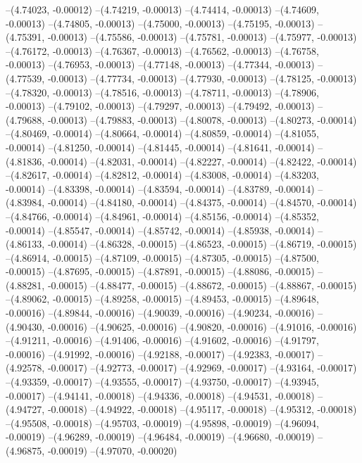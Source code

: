 --(4.74023, -0.00012)
--(4.74219, -0.00013)
--(4.74414, -0.00013)
--(4.74609, -0.00013)
--(4.74805, -0.00013)
--(4.75000, -0.00013)
--(4.75195, -0.00013)
--(4.75391, -0.00013)
--(4.75586, -0.00013)
--(4.75781, -0.00013)
--(4.75977, -0.00013)
--(4.76172, -0.00013)
--(4.76367, -0.00013)
--(4.76562, -0.00013)
--(4.76758, -0.00013)
--(4.76953, -0.00013)
--(4.77148, -0.00013)
--(4.77344, -0.00013)
--(4.77539, -0.00013)
--(4.77734, -0.00013)
--(4.77930, -0.00013)
--(4.78125, -0.00013)
--(4.78320, -0.00013)
--(4.78516, -0.00013)
--(4.78711, -0.00013)
--(4.78906, -0.00013)
--(4.79102, -0.00013)
--(4.79297, -0.00013)
--(4.79492, -0.00013)
--(4.79688, -0.00013)
--(4.79883, -0.00013)
--(4.80078, -0.00013)
--(4.80273, -0.00014)
--(4.80469, -0.00014)
--(4.80664, -0.00014)
--(4.80859, -0.00014)
--(4.81055, -0.00014)
--(4.81250, -0.00014)
--(4.81445, -0.00014)
--(4.81641, -0.00014)
--(4.81836, -0.00014)
--(4.82031, -0.00014)
--(4.82227, -0.00014)
--(4.82422, -0.00014)
--(4.82617, -0.00014)
--(4.82812, -0.00014)
--(4.83008, -0.00014)
--(4.83203, -0.00014)
--(4.83398, -0.00014)
--(4.83594, -0.00014)
--(4.83789, -0.00014)
--(4.83984, -0.00014)
--(4.84180, -0.00014)
--(4.84375, -0.00014)
--(4.84570, -0.00014)
--(4.84766, -0.00014)
--(4.84961, -0.00014)
--(4.85156, -0.00014)
--(4.85352, -0.00014)
--(4.85547, -0.00014)
--(4.85742, -0.00014)
--(4.85938, -0.00014)
--(4.86133, -0.00014)
--(4.86328, -0.00015)
--(4.86523, -0.00015)
--(4.86719, -0.00015)
--(4.86914, -0.00015)
--(4.87109, -0.00015)
--(4.87305, -0.00015)
--(4.87500, -0.00015)
--(4.87695, -0.00015)
--(4.87891, -0.00015)
--(4.88086, -0.00015)
--(4.88281, -0.00015)
--(4.88477, -0.00015)
--(4.88672, -0.00015)
--(4.88867, -0.00015)
--(4.89062, -0.00015)
--(4.89258, -0.00015)
--(4.89453, -0.00015)
--(4.89648, -0.00016)
--(4.89844, -0.00016)
--(4.90039, -0.00016)
--(4.90234, -0.00016)
--(4.90430, -0.00016)
--(4.90625, -0.00016)
--(4.90820, -0.00016)
--(4.91016, -0.00016)
--(4.91211, -0.00016)
--(4.91406, -0.00016)
--(4.91602, -0.00016)
--(4.91797, -0.00016)
--(4.91992, -0.00016)
--(4.92188, -0.00017)
--(4.92383, -0.00017)
--(4.92578, -0.00017)
--(4.92773, -0.00017)
--(4.92969, -0.00017)
--(4.93164, -0.00017)
--(4.93359, -0.00017)
--(4.93555, -0.00017)
--(4.93750, -0.00017)
--(4.93945, -0.00017)
--(4.94141, -0.00018)
--(4.94336, -0.00018)
--(4.94531, -0.00018)
--(4.94727, -0.00018)
--(4.94922, -0.00018)
--(4.95117, -0.00018)
--(4.95312, -0.00018)
--(4.95508, -0.00018)
--(4.95703, -0.00019)
--(4.95898, -0.00019)
--(4.96094, -0.00019)
--(4.96289, -0.00019)
--(4.96484, -0.00019)
--(4.96680, -0.00019)
--(4.96875, -0.00019)
--(4.97070, -0.00020)
